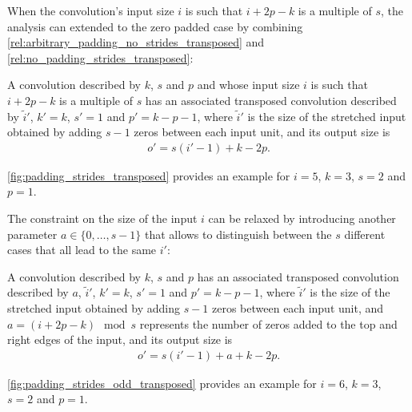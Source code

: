 When the convolution's input size $i$ is such that $i + 2p - k$ is a multiple
of $s$, the analysis can extended to the zero padded case by combining
\autoref{rel:arbitrary_padding_no_strides_transposed} and
\autoref{rel:no_padding_strides_transposed}:

\begin{relationship}\label{rel:padding_strides_transposed}
A convolution described by $k$, $s$ and $p$ and whose
input size $i$ is such that $i + 2p - k$ is a multiple of $s$ has an associated
transposed convolution described by $\tilde{i}'$, $k' = k$, $s' = 1$ and
$p' = k - p - 1$, where $\tilde{i}'$ is the size of the stretched input
obtained by adding $s - 1$ zeros between each input unit, and its output size
is
\begin{equation*}
\begin{split}
    o' = s (i' - 1) + k - 2p.
\end{split}
\end{equation*}
\end{relationship}

\autoref{fig:padding_strides_transposed} provides an example for $i = 5$, $k =
3$, $s = 2$ and $p = 1$.

The constraint on the size of the input $i$ can be relaxed by introducing
another parameter $a \in \{0, \ldots, s - 1\}$ that allows to distinguish
between the $s$ different cases that all lead to the same $i'$:

\begin{relationship}\label{rel:padding_strides_transposed_odd}
A convolution described by $k$, $s$ and $p$ has an
associated transposed convolution described by $a$, $\tilde{i}'$, $k' = k$, $s'
= 1$ and $p' = k - p - 1$, where $\tilde{i}'$ is the size of the stretched
input obtained by adding $s - 1$ zeros between each input unit, and $a = (i +
2p - k) \mod s$ represents the number of zeros added to the top and right edges
of the input, and its output size is
\begin{equation*}
\begin{split}
    o' = s (i' - 1) + a + k - 2p.
\end{split}
\end{equation*}
\end{relationship}

\autoref{fig:padding_strides_odd_transposed} provides an example for $i = 6$, $k
= 3$, $s = 2$ and $p = 1$.

